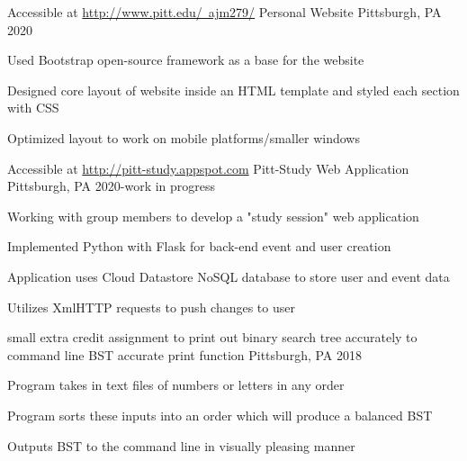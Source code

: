 \documentclass[]{awesome-cv}
\begin{document}
\begin{cventries}
	\cventry
	{Accessible at \href{http://www.pitt.edu/~ajm279/} {http://www.pitt.edu/~ajm279/}}
	{Personal Website}
	{Pittsburgh, PA}
	{2020}
	{\begin{cvitems}
		\item {Used Bootstrap open-source framework as a base for the website}
		\item {Designed core layout of website inside an HTML template and styled each section with CSS}
		\item {Optimized layout to work on mobile platforms/smaller windows}
		\end{cvitems}}
	\cventry
	{Accessible at \href{http://pitt-study.appspot.com} {http://pitt-study.appspot.com}}
	{Pitt-Study Web Application}
	{Pittsburgh, PA}
	{2020-work in progress}
	{\begin{cvitems}
		\item {Working with group members to develop a "study session" web application}
		\item {Implemented Python with Flask for back-end event and user creation}
		\item {Application uses Cloud Datastore NoSQL database to store user and event data}
		\item {Utilizes XmlHTTP requests to push changes to user }
		\end{cvitems}}
	\cventry
	{small extra credit assignment to print out binary search tree accurately to command line}
	{BST accurate print function }
	{Pittsburgh, PA}
	{2018}
	{\begin{cvitems}
		\item {Program takes in text files of numbers or letters in any order}
		\item {Program sorts these inputs into an order which will produce a balanced BST }
		\item {Outputs BST to the command line in visually pleasing manner}
		\end{cvitems}}

\end{cventries}
\end{document}
